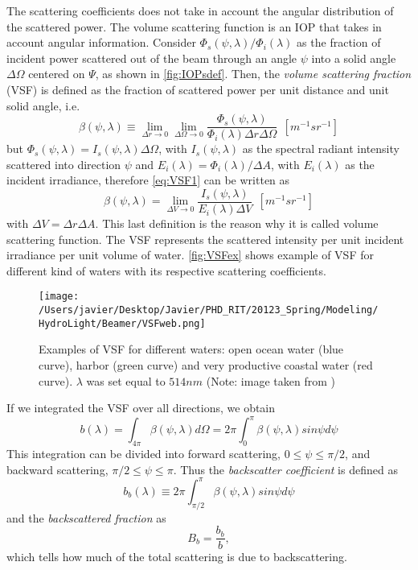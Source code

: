 The scattering coefficients does not take in account the angular distribution of the scattered power. The volume scattering function is an IOP that takes in account angular information. Consider $\Phi_s(\psi,\lambda)/\Phi_i(\lambda)$ as the fraction of incident power scattered out of the beam through an angle $\psi$ into a solid angle $\Delta\Omega$ centered on $\Psi$, as shown in \autoref{fig:IOPsdef}. Then, the {\it volume scattering fraction} (VSF)  is defined as the fraction of scattered power per unit distance and unit solid angle, i.e.
\begin{equation}\label{eq:VSF1}
  \beta(\psi,\lambda)\equiv \lim_{\Delta r\to 0} \lim_{\Delta \Omega\to 0}  \frac{\Phi_s(\psi,\lambda)}{\Phi_i(\lambda)\Delta r\Delta \Omega}~~\left[m^{-1}sr^{-1} \right]
\end{equation}
but $\Phi_s(\psi,\lambda)=I_s(\psi,\lambda)\Delta \Omega$, with $I_s(\psi,\lambda)$ as the spectral radiant intensity scattered into direction $\psi$ and $E_i(\lambda)=\Phi_i(\lambda)/\Delta A$, with $E_i(\lambda)$ as the incident irradiance, therefore \autoref{eq:VSF1} can be written as
\begin{equation} 
  \beta(\psi,\lambda)= \lim_{\Delta V\to 0} \frac{I_s(\psi,\lambda)}{E_i(\lambda)\Delta V}~~\left[m^{-1}sr^{-1} \right]
\end{equation}
with $\Delta V=\Delta r\Delta A$. This last definition is the reason why it is called volume scattering function. The VSF represents the scattered intensity per unit incident irradiance per unit volume of water. \autoref{fig:VSFex} shows example of VSF for different kind of waters with its respective scattering coefficients.

\begin{figure}[htb]
\centering
      \texttt{[image: /Users/javier/Desktop/Javier/PHD\_RIT/20123\_Spring/Modeling/HydroLight/Beamer/VSFweb.png]}
      \caption{Examples of VSF for different waters: open ocean water (blue curve), harbor (green curve) and very productive coastal water (red curve). $\lambda$ was set equal to $514nm$ (Note: image taken from \cite{Mobley:2001})}
      \label{fig:VSFex}
\end{figure}

If we integrated the VSF over all directions, we obtain
\begin{equation}
  b(\lambda)=\int_{4\pi} \beta(\psi,\lambda)d\Omega=2\pi\int_0^\pi \beta(\psi,\lambda)sin\psi d\psi
\end{equation}
This integration can be divided into forward scattering, $0\leq\psi\leq\pi/2$, and backward scattering, $\pi/2\leq\psi\leq\pi$. Thus the {\it backscatter coefficient}  is defined as
\begin{equation}
  b_b(\lambda)\equiv 2\pi\int_{\pi/2}^\pi \beta(\psi,\lambda)sin\psi d\psi
\end{equation}
and the {\it backscattered fraction}  as 
\begin{equation}
  B_b=\frac{b_b}{b},
\end{equation}
which tells how much of the total scattering is due to backscattering.

